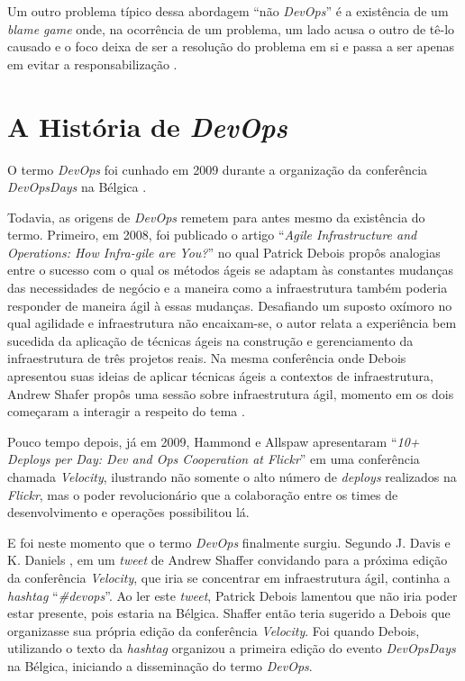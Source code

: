Um outro problema típico dessa abordagem ``não \textit{DevOps}'' é a existência
de um \textit{blame game} onde, na ocorrência de um problema, um lado acusa
o outro de tê-lo causado e o foco deixa de ser a resolução do problema em si
e passa a ser apenas em evitar a responsabilização \cite{toward_unified_model}.

\section{A História de \textit{DevOps}}\label{secao_historico_devops}

O termo \textit{DevOps} foi cunhado em 2009 durante a organização da
conferência \textit{DevOpsDays} na Bélgica \cite{devops_for_developers}.

Todavia, as origens de \textit{DevOps} remetem para antes mesmo da existência
do termo. Primeiro, em 2008, foi publicado o artigo ``\textit{Agile
Infrastructure and Operations: How Infra-gile are You?}''
\cite{agile_infra_operations} no qual
Patrick Debois propôs analogias entre o sucesso com o qual os métodos ágeis
se adaptam às constantes mudanças das necessidades de negócio e a maneira como
a infraestrutura também poderia responder de maneira ágil à essas mudanças.
Desafiando um suposto oxímoro no qual agilidade e infraestrutura não
encaixam-se, o autor relata a experiência bem sucedida da aplicação de técnicas
ágeis na construção e gerenciamento da infraestrutura de três projetos reais.
Na mesma conferência onde Debois apresentou suas ideias de aplicar técnicas
ágeis a contextos de infraestrutura, Andrew Shafer propôs uma sessão sobre
infraestrutura ágil, momento em os dois começaram a interagir a respeito do
tema \cite{effective_devops}.

Pouco tempo depois, já em 2009, Hammond e Allspaw apresentaram ``\textit{10+ Deploys
per Day: Dev and Ops Cooperation at Flickr}'' \cite{flickr} em uma conferência
chamada \textit{Velocity}, ilustrando não somente o alto número de
\textit{deploys} realizados na \textit{Flickr}, mas o poder revolucionário que
a colaboração entre os times de desenvolvimento e operações possibilitou lá.

E foi neste momento que o termo \textit{DevOps} finalmente surgiu. Segundo
J. Davis e K. Daniels \cite{effective_devops}, em um \textit{tweet} de Andrew
Shaffer convidando para a próxima edição da conferência \textit{Velocity}, que
iria se concentrar em infraestrutura ágil, continha a \textit{hashtag}
``\textit{\#devops}''. Ao ler este \textit{tweet}, Patrick Debois lamentou que
não iria poder estar presente, pois estaria na Bélgica. Shaffer então teria
sugerido a Debois que organizasse sua própria edição da conferência
\textit{Velocity}. Foi quando Debois, utilizando o texto da \textit{hashtag}
organizou a primeira edição do evento \textit{DevOpsDays} na Bélgica,
iniciando a disseminação do termo \textit{DevOps}.

